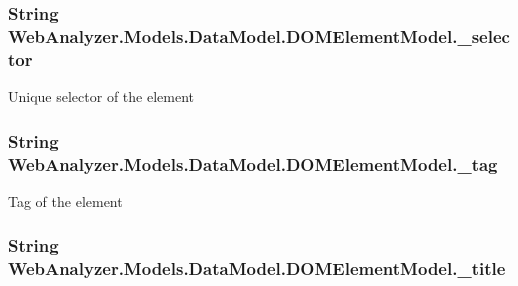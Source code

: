 \subsubsection[{\+\_\+selector}]{\setlength{\rightskip}{0pt plus 5cm}String Web\+Analyzer.\+Models.\+Data\+Model.\+D\+O\+M\+Element\+Model.\+\_\+selector\hspace{0.3cm}{\ttfamily [private]}}\label{class_web_analyzer_1_1_models_1_1_data_model_1_1_d_o_m_element_model_a1fba31f038cfcd20e7be095aa736695a}


Unique selector of the element 

\hypertarget{class_web_analyzer_1_1_models_1_1_data_model_1_1_d_o_m_element_model_a189cb52ec2fbbc5d2fad73187ffa9404}{}
\subsubsection[{\+\_\+tag}]{\setlength{\rightskip}{0pt plus 5cm}String Web\+Analyzer.\+Models.\+Data\+Model.\+D\+O\+M\+Element\+Model.\+\_\+tag\hspace{0.3cm}{\ttfamily [private]}}\label{class_web_analyzer_1_1_models_1_1_data_model_1_1_d_o_m_element_model_a189cb52ec2fbbc5d2fad73187ffa9404}


Tag of the element 

\hypertarget{class_web_analyzer_1_1_models_1_1_data_model_1_1_d_o_m_element_model_a1f78ca7c25fcb00ee45f23482ae92c3a}{}
\subsubsection[{\+\_\+title}]{\setlength{\rightskip}{0pt plus 5cm}String Web\+Analyzer.\+Models.\+Data\+Model.\+D\+O\+M\+Element\+Model.\+\_\+title\hspace{0.3cm}{\ttfamily [private]}}\label{class_web_analyzer_1_1_models_1_1_data_model_1_1_d_o_m_element_model_a1f78ca7c25fcb00ee45f23482ae92c3a}


